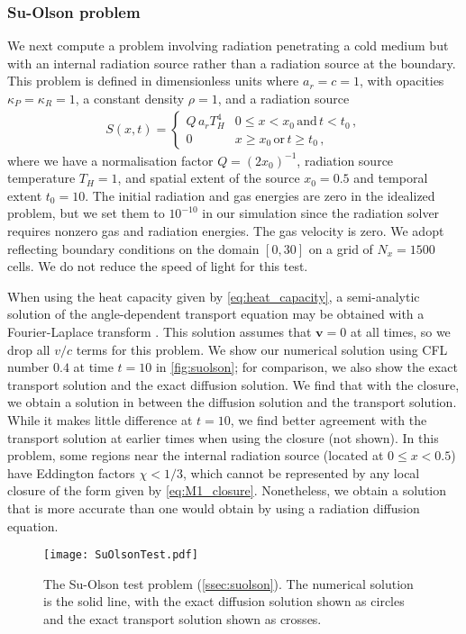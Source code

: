 \documentclass[fleqn,usenatbib]{mnras}
\newcommand{\vc}[1]{{\mathbf{#1}}}
\begin{document}
\subsubsection{Su-Olson problem}
\label{ssec:suolson}
We next compute a problem involving radiation penetrating a cold medium but with an internal radiation source rather than a radiation source at the boundary. This problem is defined in dimensionless units where $a_r = c = 1$, with opacities $\kappa_P = \kappa_R = 1$, a constant density $\rho = 1$, and a radiation source
\begin{align}
S(x,t) =
\begin{cases}
    Q \, a_r T_H^4 & 0 \leq x < x_0 \, \text{and} \, t < t_0 \, , \\
    0 & x \geq x_0 \, \text{or} \, t \geq t_0 \, ,
\end{cases}
\end{align}
where we have a normalisation factor $Q = (2 x_0)^{-1}$, radiation source temperature $T_H = 1$, and spatial extent of the source $x_0 = 0.5$ and temporal extent $t_0 = 10$. The initial radiation and gas energies are zero in the idealized problem, but we set them to $10^{-10}$ in our simulation since the radiation solver requires nonzero gas and radiation energies. The gas velocity is zero. We adopt reflecting boundary conditions on the domain $[0, 30]$ on a grid of $N_x = 1500$ cells. We do not reduce the speed of light for this test.

When using the heat capacity given by \autoref{eq:heat_capacity}, a semi-analytic solution of the angle-dependent transport equation may be obtained with a Fourier-Laplace transform \citep{Su_1997}. This solution assumes that $\vc{v} = 0$ at all times, so we drop all $v/c$ terms for this problem. We show our numerical solution using CFL number $0.4$ at time $t = 10$  in \autoref{fig:suolson}; for comparison, we also show the exact transport solution and the exact diffusion solution. We find that with the \cite{Levermore_1984} closure, we obtain a solution in between the diffusion solution and the transport solution. While it makes little difference at $t = 10$, we find better agreement with the transport solution at earlier times when using the \cite{Minerbo_1978} closure (not shown). In this problem, some regions near the internal radiation source (located at $0 \leq x < 0.5$) have Eddington factors $\chi < 1/3$, which cannot be represented by any local closure of the form given by \autoref{eq:M1_closure}.  Nonetheless, we obtain a solution that is more accurate than one would obtain by using a radiation diffusion equation.
\begin{figure}
    \texttt{[image: SuOlsonTest.pdf]}
    \caption{The Su-Olson test problem (\autoref{ssec:suolson}). The numerical solution is the solid line, with the exact diffusion solution shown as circles and the exact transport solution shown as crosses.}
    \label{fig:suolson}
\end{figure}
\end{document}
